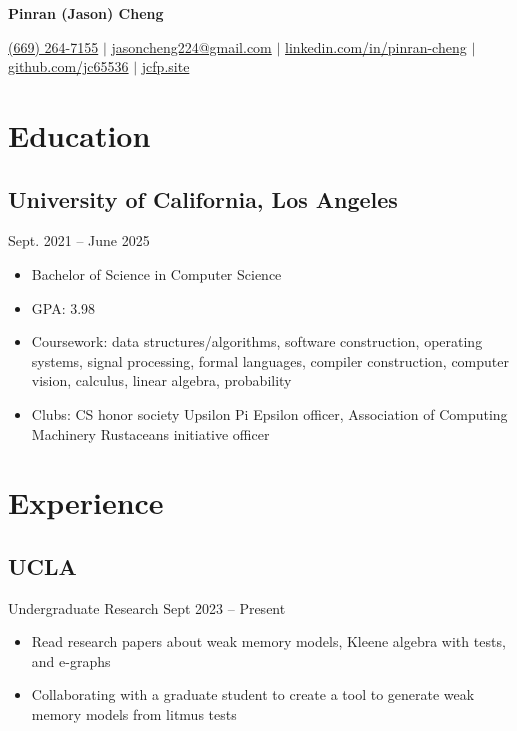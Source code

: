 \documentclass{article}
\begin{document}
\begin{center}
  \setlength{\parskip}{4pt}

  \Large \textbf{Pinran (Jason) Cheng}

  \normalsize
  \href{tel:+1-669-264-7155}{(669) 264-7155} $|$
  \href{mailto:jasoncheng224@gmail.com}{jasoncheng224@gmail.com} $|$
  \href{https://www.linkedin.com/in/pinran-cheng/}{linkedin.com/in/pinran-cheng} $|$
  \href{https://github.com/jc65536}{github.com/jc65536} $|$
  \href{https://jcfp.site/}{jcfp.site}
\end{center}

\section*{Education}

\subsection*{University of California, Los Angeles}
\hfill Sept. 2021 -- June 2025
\begin{itemize}
  \item Bachelor of Science in Computer Science

  \item GPA: 3.98

  \item Coursework: data structures/algorithms, software construction,
        operating systems, signal processing, formal languages, compiler
        construction, computer vision, calculus, linear algebra, probability

  \item Clubs: CS honor society Upsilon Pi Epsilon officer, Association of
        Computing Machinery Rustaceans initiative officer
\end{itemize}

\section*{Experience}

\subsection*{UCLA} Undergraduate Research
\hfill Sept 2023 -- Present
\begin{itemize}
  \item Read research papers about weak memory models, Kleene algebra with
        tests, and e-graphs

  \item Collaborating with a graduate student to create a tool to generate weak
        memory models from litmus tests
\end{itemize}
\end{document}
